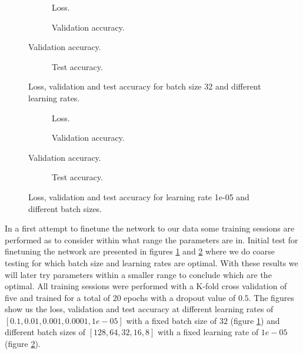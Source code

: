 \begin{figure}
	\begin{subfigure}[b]{\textwidth}
		
		\caption{Loss.}
	\end{subfigure}

	\begin{subfigure}[b]{\textwidth}
		
		\caption{Validation accuracy.}
	\end{subfigure}
\end{figure}

\begin{figure}
	\ContinuedFloat
	\begin{subfigure}[b]{\textwidth}
		
		\caption{Test accuracy.}
	\end{subfigure}
	\caption{Loss, validation and test accuracy for batch size 32 and different learning rates.}
	\label{fig:res_init_lr}
\end{figure}


\begin{figure}
	\begin{subfigure}[b]{\textwidth}
		
		\caption{Loss.}
	\end{subfigure}

	\begin{subfigure}[b]{\textwidth}
		
		\caption{Validation accuracy.}
	\end{subfigure}
\end{figure}

\begin{figure}
	\ContinuedFloat
	\begin{subfigure}[b]{\textwidth}
		
		\caption{Test accuracy.}
	\end{subfigure}
	\caption{Loss, validation and test accuracy for learning rate 1e-05 and different batch sizes.}
	\label{fig:res_init_bs}
\end{figure}


In a first attempt to finetune the network to our data some training sessions are performed as to consider within what range the parameters are in. Initial test for finetuning the network are presented in figures \ref{fig:res_init_lr} and \ref{fig:res_init_bs} where we do coarse testing for which batch size and learning rates are optimal. With these results we will later try parameters within a smaller range to conclude which are the optimal. All training sessions were performed with a K-fold cross validation of five and trained for a total of 20 epochs with a dropout value of \(0.5\). The figures show us the loss, validation and test accuracy at different learning rates of \([0.1, 0.01, 0.001, 0.0001, 1e-05]\) with a fixed batch size of \(32\) (figure \ref{fig:res_init_lr}) and different batch sizes of \([128, 64, 32, 16, 8]\) with a fixed learning rate of \(1e-05\) (figure \ref{fig:res_init_bs}).

